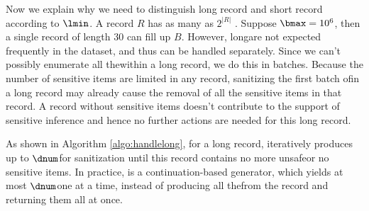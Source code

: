 Now we explain why we need to distinguish long record and short record
according to $\lmin$.
A record $R$ has as many as $2^{|R|}$ \qidsx.
Suppose $\bmax = 10^6$, then a single record of length $30$
can fill up $B$.
However, long\qids are not expected frequently in the dataset,
and thus can be handled separately. Since we can't possibly enumerate
all the\qids within a long record, we do this in batches. Because the
number of sensitive items are limited in any record, sanitizing the
first batch of\qids in a long record may already cause the removal of
all the sensitive items in that record. A record without sensitive items
doesn't contribute to the support of sensitive inference and hence
no further actions are needed for this long record.

%
%

As shown in Algorithm \ref{algo:handlelong}, for a long record,
\Enum iteratively produces up to $\dnum$\qids for sanitization
until this record contains no more unsafe\qids or no sensitive items.
In practice, \Enum is a continuation-based \cite{Reynolds93:continuations}
generator, which yields at most $\dnum$\qids one at a time,
instead of producing all the\qids from the record and returning them all at once.

